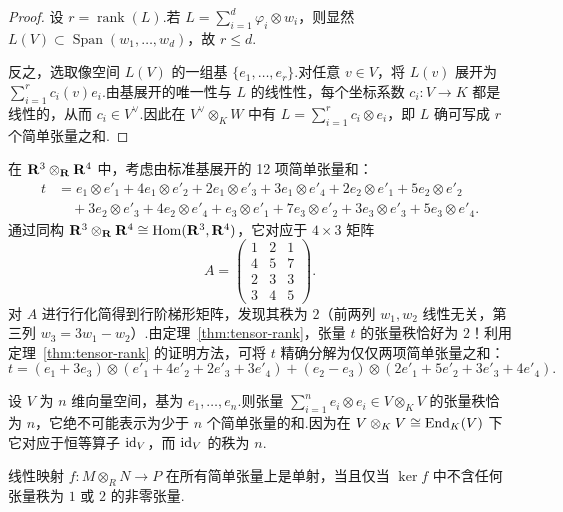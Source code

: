 \begin{proof}
设 $r = \operatorname{rank}(L)$.若 $L = \sum_{i=1}^d \varphi_i \otimes w_i$，则显然 $L(V) \subset \operatorname{Span}(w_1, \dots, w_d)$，故 $r \leq d$.

反之，选取像空间 $L(V)$ 的一组基 $\{e_1, \dots, e_r\}$.对任意 $v \in V$，将 $L(v)$ 展开为 $\sum_{i=1}^r c_i(v) e_i$.由基展开的唯一性与 $L$ 的线性性，每个坐标系数 $c_i \colon V \to K$ 都是线性的，从而 $c_i \in V^\vee$.因此在 $V^\vee \otimes_K W$ 中有 $L = \sum_{i=1}^r c_i \otimes e_i$，即 $L$ 确可写成 $r$ 个简单张量之和.
\end{proof}

\begin{example}\label{ex:r3-r4-rank}
在 $\mathbf{R}^3 \otimes_{\mathbf{R}} \mathbf{R}^4$ 中，考虑由标准基展开的 12 项简单张量和：
\begin{align*}
  t &= e_1 \otimes e'_1 + 4e_1 \otimes e'_2 + 2e_1 \otimes e'_3 + 3e_1 \otimes e'_4 + 2e_2 \otimes e'_1 + 5e_2 \otimes e'_2 \\
  &\quad + 3e_2 \otimes e'_3 + 4e_2 \otimes e'_4 + e_3 \otimes e'_1 + 7e_3 \otimes e'_2 + 3e_3 \otimes e'_3 + 5e_3 \otimes e'_4.
\end{align*}
通过同构 $\mathbf{R}^3 \otimes_{\mathbf{R}} \mathbf{R}^4 \cong \operatorname{Hom}(\mathbf{R}^3, \mathbf{R}^4)$，它对应于 $4 \times 3$ 矩阵
\[
  A = \begin{pmatrix}
    1 & 2 & 1 \\
    4 & 5 & 7 \\
    2 & 3 & 3 \\
    3 & 4 & 5
  \end{pmatrix}.
\]
对 $A$ 进行行化简得到行阶梯形矩阵，发现其秩为 $2$（前两列 $w_1, w_2$ 线性无关，第三列 $w_3 = 3w_1 - w_2$）.由定理~\ref{thm:tensor-rank}，张量 $t$ 的张量秩恰好为 $2$！利用定理~\ref{thm:tensor-rank} 的证明方法，可将 $t$ 精确分解为仅仅两项简单张量之和：
\[
  t = (e_1 + 3e_3) \otimes (e'_1 + 4e'_2 + 2e'_3 + 3e'_4) + (e_2 - e_3) \otimes (2e'_1 + 5e'_2 + 3e'_3 + 4e'_4).
\]
\end{example}

\begin{example}\label{ex:id-tensor-rank}
设 $V$ 为 $n$ 维向量空间，基为 $e_1, \dots, e_n$.则张量 $\sum_{i=1}^n e_i \otimes e_i \in V \otimes_K V$ 的张量秩恰为 $n$，它绝不可能表示为少于 $n$ 个简单张量的和.因为在 $V \otimes_K V \cong \operatorname{End}_K(V)$ 下它对应于恒等算子 $\operatorname{id}_V$，而 $\operatorname{id}_V$ 的秩为 $n$.
\end{example}

\begin{theorem}\label{thm:injective-elementary}
线性映射 $f \colon M \otimes_R N \to P$ 在所有简单张量上是单射，当且仅当 $\ker f$ 中不含任何张量秩为 $1$ 或 $2$ 的非零张量.
\end{theorem}

